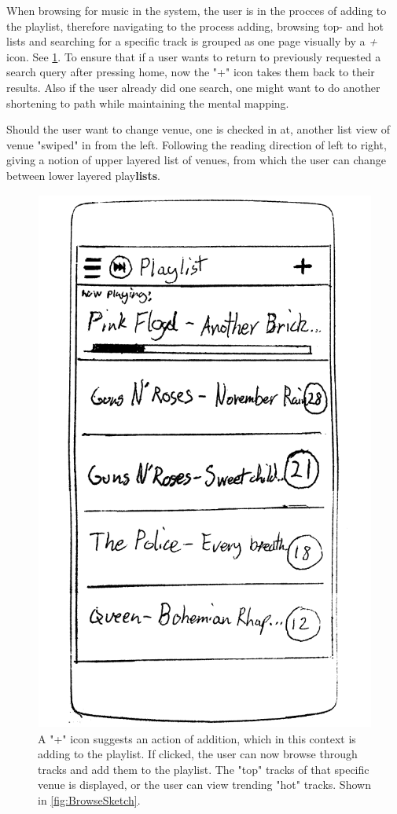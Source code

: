 When browsing for music in the system, the user is in the procces of
adding to the playlist, therefore navigating to the process adding,
browsing top- and hot lists and searching for a specific track is
grouped as one page visually by a \emph{+} icon. See
\cref{fig:PlaylistSketch}. To ensure that if a user wants to return to
previously requested a search query after pressing home, now the "+"
icon takes them back to their results. Also if the user already did
one search, one might want to do another shortening to path while
maintaining the mental mapping. 

Should the user want to change venue, one is checked in at, another list view of venue "swiped" in from the left. Following the reading direction of left to right, giving a notion of upper layered list of venues, from which the user can change between lower layered play\textbf{lists}.


\begin{figure}[hbtp]
  \centering
  \includegraphics[width=0.3\linewidth]{Images/sketch3.png}
  \caption{A "+" icon suggests an action of addition, which in this context is adding to the playlist. If clicked, the user can now browse through tracks and add them to the playlist. The "top" tracks of that specific venue is displayed, or the user can view trending "hot" tracks. Shown in \cref{fig:BrowseSketch}.}
  \label{fig:PlaylistSketch}
\end{figure}

